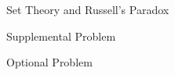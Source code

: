 \documentclass[handout]{mcs}
\begin{document}

\begin{staffnotes}
Set Theory and Russell's Paradox
\end{staffnotes}





\begin{center}
Supplemental Problem
\end{center}


\begin{center}
Optional Problem
\end{center}



\end{document}
